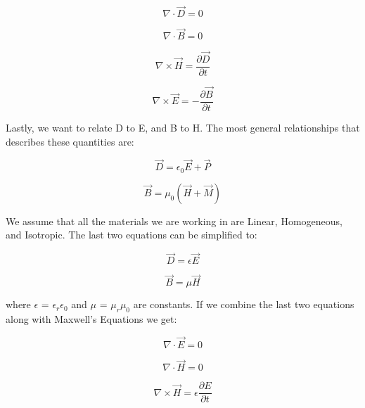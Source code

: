 \documentclass[12pt]{article}
\begin{document}
\begin{equation}
	\nabla \cdot \vec{D} = 0
\end{equation}

\begin{equation}
	\nabla \cdot \vec{B} = 0
\end{equation}

\begin{equation}
	\nabla \times \vec{H} = \frac{\partial \vec{D}}{\partial t}
\end{equation}

\begin{equation}
	\nabla \times \vec{E} = -\frac{\partial \vec{B}}{\partial t}
\end{equation}

Lastly, we want to relate D to E, and B to H. The most general relationships that describes these quantities are:

\begin{equation}
	\vec{D} = \epsilon_{0}\vec{E} + \vec{P}
\end{equation}

\begin{equation}
	\vec{B} = \mu_{0}(\vec{H} + \vec{M})
\end{equation}

We assume that all the materials we are working in are Linear, Homogeneous, and Isotropic. The last two equations can be simplified to:

\begin{equation}
	\vec{D} = \epsilon\vec{E}
\end{equation}

\begin{equation}
	\vec{B} = \mu\vec{H}
\end{equation}

where \(\epsilon\) = \(\epsilon_{r}\)\(\epsilon_{0}\) and \(\mu\) = \(\mu_{r}\)\(\mu_{0}\) are constants. If we combine the last two equations along with Maxwell's Equations we get:

\begin{equation}
	\nabla \cdot \vec{E} = 0
\end{equation}

\begin{equation}
	\nabla \cdot \vec{H} = 0
\end{equation}

\begin{equation}
	\nabla \times \vec{H} = \epsilon\frac{\partial E}{\partial t}
\end{equation}
\end{document}
